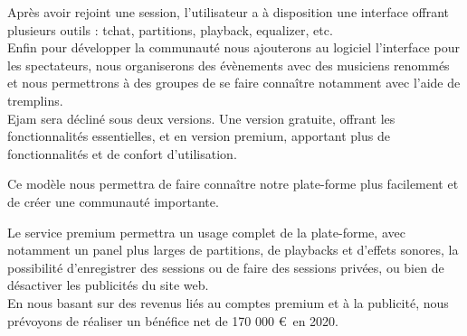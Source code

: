 \documentclass[a4,12pt]{article}
\begin{document}
Après avoir rejoint une session, l'utilisateur a à disposition une interface offrant plusieurs outils : tchat, partitions, playback, equalizer, etc.\\


Enfin pour développer la communauté nous ajouterons au logiciel
l’interface pour les spectateurs, nous organiserons des évènements avec des
musiciens renommés et nous permettrons à des groupes de se faire connaître notamment
avec l’aide de tremplins.
\\

Ejam sera décliné sous deux versions. Une version gratuite, offrant les fonctionnalités essentielles, et en version premium, apportant plus de fonctionnalités et de confort d'utilisation.

Ce modèle nous permettra de faire connaître notre plate-forme plus facilement et de créer une communauté importante.

Le service premium permettra un usage complet de la plate-forme, avec notamment un panel plus larges de partitions, de playbacks et d'effets sonores, la possibilité d'enregistrer des sessions ou de faire des sessions privées, ou bien de désactiver les publicités du site web.\\

En nous basant sur des revenus liés au comptes premium et à la publicité, nous prévoyons de réaliser un bénéfice net de 170 000 \euro\ en 2020.
\end{document}
